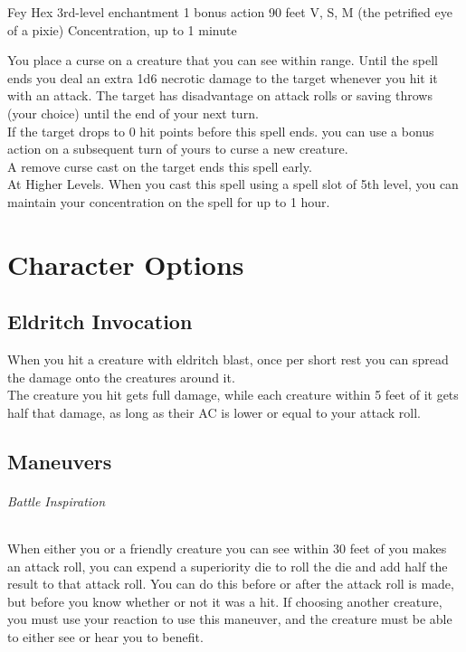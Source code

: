 \documentclass[letter,10pt,twocolumn,openany]{dndbook}
\begin{document}
\DndSpellHeader
  {Fey Hex}
  {3rd-level enchantment}
  {1 bonus action}
  {90 feet}
  {V, S, M (the petrified eye of a pixie)}
  {Concentration, up to 1 minute}

You place a curse on a creature that you can see within range. Until the spell ends you deal an extra 1d6 necrotic damage to the target whenever you hit it with an attack. The target has disadvantage on attack rolls or saving throws (your choice) until the end of your next turn.\\
If the target drops to 0 hit points before this spell ends. you can use a bonus action on a subsequent turn of yours to curse a new creature.\\
A remove curse cast on the target ends this spell early.\\
At Higher Levels. When you cast this spell using a spell slot of 5th level, you can maintain your concentration on the spell for up to 1 hour.

\chapter{Character Options}

\section{Eldritch Invocation}


When you hit a creature with eldritch blast, once per short rest you can spread the damage onto the creatures around it.\\
The creature you hit gets full damage, while each creature within 5 feet of it gets half that damage, as long as their AC is lower or equal to your attack roll.

\section{Maneuvers}

\subparagraph{Battle Inspiration}
When either you or a friendly creature you can see within 30 feet of you makes an attack roll, you can expend a superiority die to roll the die and add half the result to that attack roll. You can do this before or after the attack roll is made, but before you know whether or not it was a hit. If choosing another creature, you must use your reaction to use this maneuver, and the creature must be able to either see or hear you to benefit.
\end{document}
